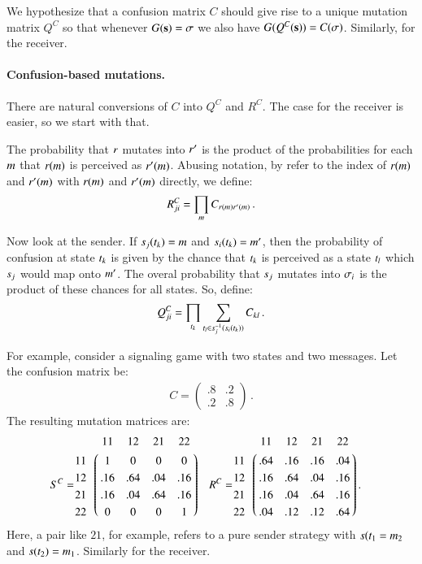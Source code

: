 We hypothesize that a confusion matrix $C$ should give rise to a
unique mutation matrix $Q^C$ so that whenever $G(\mathrm{\mathbf{s}}) = \sigma$
we also have $G(Q^C(\mathrm{\mathbf{s}})) = C(\sigma)$. Similarly, for the
receiver.

\paragraph{Confusion-based mutations.} There are natural conversions
of $C$ into $Q^C$ and $R^C$. The case for the receiver is easier, so
we start with that.

The probability that $r$ mutates into $r'$ is the product of
the probabilities for each $m$ that $r(m)$ is perceived
as $r'(m)$. Abusing notation, by refer to the index of
$r(m)$ and $r'(m)$ with $r(m)$ and
$r'(m)$ directly, we define:
\begin{align*}
  R^C_{ji} = \prod_{m} C_{r(m)r'(m)}\,.
\end{align*}

Now look at the sender. If $s_j(t_k)=m$ and
$s_i(t_k)=m'$, then the probability of confusion at
state $t_k$ is given by the chance that $t_k$ is perceived
as a state $t_l$ which $s_j$ would map onto $m'$. The
overal probability that $s_j$ mutates into $\sigma_i$ is the
product of these chances for all states. So, define:
\begin{align*}
  Q^C_{ji} = \prod_{t_k} \sum_{t_l \in
    s_j^{-1}(s_i(t_k))} C_{kl}\,.
\end{align*}

For example, consider a signaling game with two states and two
messages. Let the confusion matrix be:
\begin{align*}
  C=
  \begin{pmatrix}
    .8 & .2 \\
    .2 & .8 
  \end{pmatrix}\,.
\end{align*}
The resulting mutation matrices are:
\begin{align*}
S^C & = \bordermatrix{ ~ & 11 & 12 & 21 & 22 \cr
                      11 & 1 & 0 & 0 & 0 \cr
                      12 & .16 & .64 & .04 & .16 \cr
                      21 & .16 & .04 & .64 & .16 \cr
                      22 & 0 & 0 & 0 & 1 \cr}
&                    
  R^C & = \bordermatrix{ ~ & 11 & 12 & 21 & 22 \cr
                      11 & .64 & .16 & .16 & .04 \cr
                      12 & .16 & .64 & .04 & .16 \cr
                      21 & .16 & .04 & .64 & .16 \cr
                      22 & .04 & .12 & .12 & .64 \cr}\,.
\end{align*}
Here, a pair like $21$, for example, refers to a pure sender strategy
with $s(t_1=m_2$ and $s(t_2) =
m_1$. Similarly for the receiver.

